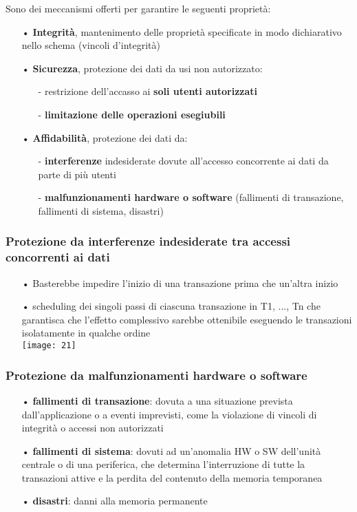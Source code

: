 \documentclass[12pt, letterpaper]{article}
\begin{document}
Sono dei meccanismi offerti per garantire le seguenti proprietà:
\begin{itemize}
   \item[•] \textbf{Integrità}, mantenimento delle proprietà specificate in modo dichiarativo nello
schema (vincoli d’integrità)
   \item[•] \textbf{Sicurezza}, protezione dei dati da usi non autorizzato:
      \begin{itemize}
         \item[-] restrizione dell'accasso ai \textbf{soli utenti autorizzati}
         \item[-] \textbf{limitazione delle operazioni esegiubili}
      \end{itemize}
   \item[•] \textbf{Affidabilità}, protezione dei dati da:
      \begin{itemize}
         \item[-] \textbf{interferenze} indesiderate dovute all’accesso concorrente ai dati da parte di
più utenti
         \item[-] \textbf{malfunzionamenti hardware o software} (fallimenti di transazione, fallimenti
di sistema, disastri)
      \end{itemize}
\end{itemize}

\subsubsection{Protezione da interferenze indesiderate tra accessi concorrenti ai dati}
\begin{itemize}
   \item[•] Basterebbe impedire l'inizio di una transazione prima che un'altra inizio
   \item[•] scheduling dei singoli passi di ciascuna transazione in {T1, ..., Tn} che
garantisca che l’effetto complessivo sarebbe ottenibile eseguendo le transazioni
isolatamente in qualche ordine\\
      \texttt{[image: 21]}
\end{itemize}

\subsubsection{Protezione da malfunzionamenti hardware o software}
\begin{itemize}
   \item[•] \textbf{fallimenti di transazione}: dovuta a una situazione prevista dall’applicazione o a
eventi imprevisti, come la violazione di vincoli di integrità o accessi non
autorizzati
   \item[•] \textbf{fallimenti di sistema}: dovuti ad un’anomalia HW o SW dell'unità centrale o di
una periferica, che determina l'interruzione di tutte la transazioni attive e la
perdita del contenuto della memoria temporanea
   \item[•] \textbf{disastri}: danni alla memoria permanente
\end{itemize}
\end{document}
